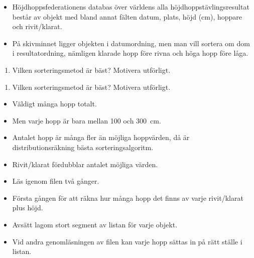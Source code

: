 \begin{frame}
  \begin{exercise}
    \begin{itemize}
      \item Höjdhoppsfederationens databas över världens alla 
        höjdhoppstävlingsresultat består av objekt med bland annat fälten 
        datum, plats, höjd (cm), hoppare och rivit/klarat.
      \item På skivminnet ligger objekten i datumordning, men man vill sortera 
        om dom i resultatordning, nämligen klarade hopp före rivna och höga 
        hopp före låga.
    \end{itemize}
    \begin{enumerate}
      \item Vilken sorteringsmetod är bäst? Motivera utförligt.
    \end{enumerate}
  \end{exercise}
\end{frame}

\begin{frame}
  \begin{exercise}
    \begin{enumerate}
      \item Vilken sorteringsmetod är bäst? Motivera utförligt.
    \end{enumerate}
  \end{exercise}

  \begin{solution}
    \begin{itemize}
      \item Väldigt många hopp totalt.
      \item Men varje hopp är bara mellan \si{100} och \SI{300}{\centi\metre}.
      \item Antalet hopp är många fler än möjliga hoppvärden, då är 
        distributionsräkning bästa sorteringsalgoritm.
      \item Rivit/klarat fördubblar antalet möjliga värden.
    \end{itemize}
  \end{solution}
\end{frame}

\begin{frame}
  \begin{solution}
    \begin{itemize}
      \item Läs igenom filen två gånger.
      \item Första gången för att räkna hur många hopp det finns av varje 
        rivit/klarat plus höjd.
      \item Avsätt lagom stort segment av listan för varje objekt.
      \item Vid andra genomläsningen av filen kan varje hopp sättas in på rätt 
        ställe i listan.
    \end{itemize}
  \end{solution}
\end{frame}

